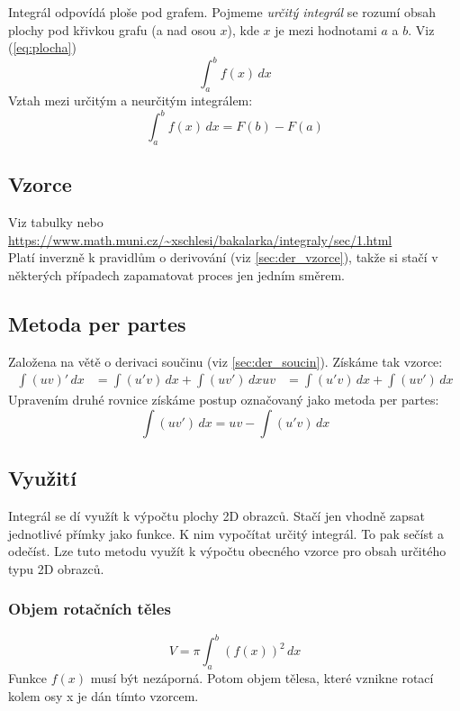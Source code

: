 \documentclass[12pt]{article}
\begin{document}
Integrál odpovídá ploše pod grafem. Pojmeme \emph{určitý integrál} se rozumí obsah plochy pod křivkou grafu (a nad osou $x$), kde $x$ je mezi hodnotami $a$ a $b$. Viz (\ref{eq:plocha})
\begin{equation}
\label{eq:plocha}
\int_a^b f(x)\,dx
\end{equation}
Vztah mezi určitým a neurčitým integrálem:
\begin{equation}
\int_{a}^{b} \! f(x)  \,dx = F(b) - F(a)
\end{equation}
\subsection{Vzorce}
Viz tabulky nebo \url{https://www.math.muni.cz/~xschlesi/bakalarka/integraly/sec/1.html}\\ Platí inverzně k pravidlům o derivování (viz \ref{sec:der_vzorce}), takže si stačí v některých případech zapamatovat proces jen jedním směrem.
\subsection{Metoda per partes}
Založena na větě o derivaci součinu (viz \ref{sec:der_soucin}). Získáme tak vzorce:
\begin{align}
\int (uv)'\,dx &= \int(u'v)\,dx + \int(uv')\,dx
uv &= \int(u'v)\,dx + \int(uv')\,dx
\end{align}
Upravením druhé rovnice získáme postup označovaný jako metoda per partes:
\begin{equation}
\int(uv')\,dx = uv - \int(u'v)\,dx
\end{equation}

\subsection{Využití}
\label{sec:vyuziti_integralu}
Integrál se dí využít k výpočtu plochy 2D obrazců. Stačí jen vhodně zapsat jednotlivé přímky jako funkce. K nim vypočítat určitý integrál. To pak sečíst a odečíst. Lze tuto metodu využít k výpočtu obecného vzorce pro obsah určitého typu 2D obrazců.
\subsubsection{Objem rotačních těles}
\begin{equation}
V = \pi \int_a^b (f(x))^2 \,d x
\end{equation}
Funkce $f(x)$ musí být nezáporná. Potom objem tělesa, které vznikne rotací kolem osy x je dán tímto vzorcem.
\end{document}
